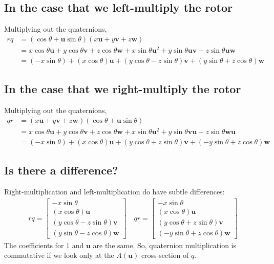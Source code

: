 \documentclass[12pt]{article}
\begin{document}
	\subsection{In the case that we left-multiply the rotor}
	
	Multiplying out the quaternions,
	 	\begin{align*} rq &= (\cos\theta + \mathbf{u}\sin\theta)(x\mathbf{u} + y\mathbf{v} + z\mathbf{w}) \\
	 					  &= x\cos\theta\mathbf{u} + y\cos\theta\mathbf{v} + z\cos\theta\mathbf{w} + x\sin\theta\mathbf{u}^2 + y\sin\theta\mathbf{uv} + z\sin\theta\mathbf{uw}	 \\
	 					  &= (-x\sin\theta) + (x\cos\theta)\mathbf{u} + (y\cos\theta - z\sin\theta)\mathbf{v} + (y\sin\theta + z\cos\theta)\mathbf{w}
	 	\end{align*}	 
	 	
	 	\subsection{In the case that we right-multiply the rotor}
	
	Multiplying out the quaternions,
	 	\begin{align*} qr &= (x\mathbf{u} + y\mathbf{v} + z\mathbf{w})(\cos\theta + \mathbf{u}\sin\theta) \\
	 					  &= x\cos\theta\mathbf{u} + y\cos\theta\mathbf{v} + z\cos\theta\mathbf{w} + x\sin\theta\mathbf{u}^2 + y\sin\theta\mathbf{vu} + z\sin\theta\mathbf{wu}	 \\
	 					  &= (-x\sin\theta) + (x\cos\theta)\mathbf{u} + (y\cos\theta + z\sin\theta)\mathbf{v} + (-y\sin\theta + z\cos\theta)\mathbf{w}
	 	\end{align*}	
	 	
		\subsection{Is there a difference?}
		 	
	 	Right-multiplication and left-multiplication do have subtle differences:
	 	\begin{align*}
	 		rq =
	 		\begin{bmatrix}
	 			-x\sin\theta \\
	 			(x\cos\theta)\mathbf{u} \\
	 			(y\cos\theta - z\sin\theta)\mathbf{v} \\
	 			(y\sin\theta - z\cos\theta)\mathbf{w}
			\end{bmatrix} \quad
	 		qr =	 		
	 		\begin{bmatrix}
	 			-x\sin\theta \\
	 			(x\cos\theta)\mathbf{u} \\
	 			(y\cos\theta + z\sin\theta)\mathbf{v} \\
	 			(-y\sin\theta + z\cos\theta)\mathbf{w}
			\end{bmatrix}
		\end{align*}
	The coefficients for $1$ and $\mathbf{u}$ are the same. 
	So, quaternion multiplication is commutative if we look only at the  $A(\mathbf{u})$ cross-section of $q$.
	
\end{document}
